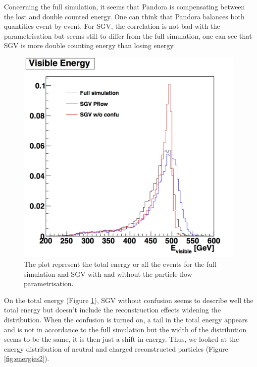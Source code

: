 \documentclass[a4paper,12pt]{article}
\begin{document}
Concerning the full simulation, it seems that Pandora is compensating between the lost and double counted energy. One can think that Pandora balances both quantities event by event. For SGV, the correlation is not bad with the parametrisation but seems still to differ from the full simulation, one can see that SGV is more double counting energy than losing energy. 

\begin{figure}[!h]
\centering
    \includegraphics[scale=0.4]{Evis.png} 
    \caption{The plot represent the total energy or all the events for the full simulation and SGV with and without the particle flow parametrisation.}
   \label{fig:energy}
\end{figure}

On the total energy (Figure \ref{fig:energy}), SGV without confusion seems to describe well the total energy but doesn't include the reconstruction effects widening the distribution. When the confusion is turned on, a tail in the total energy appears and is not in accordance to the full simulation but the width of the distribution seems to be the same, it is then just a shift in energy. Thus, we looked at the energy distribution of neutral and charged reconstructed particles (Figure \ref{fig:energies2}). 
\end{document}
